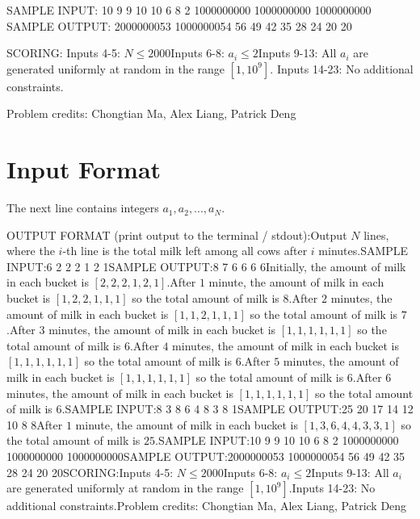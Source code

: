 \documentclass[12pt]{article}
\begin{document}
SAMPLE INPUT:
10
9 9 10 10 6 8 2 1000000000 1000000000 1000000000
SAMPLE OUTPUT: 
2000000053
1000000054
56
49
42
35
28
24
20
20

SCORING:
Inputs 4-5: $N \le 2000$Inputs 6-8: $a_i \le 2$Inputs
9-13: All $a_i$ are generated uniformly at random in the range $[1,10^9]$. Inputs 14-23: No additional constraints.


Problem credits: Chongtian Ma, Alex Liang, Patrick Deng



\section*{Input Format}
The next line contains integers $a_1,a_2,...,a_N$.

OUTPUT FORMAT (print output to the terminal / stdout):Output $N$ lines, where the $i$-th line is the total milk left among all cows
after $i$ minutes.SAMPLE INPUT:6
2 2 2 1 2 1SAMPLE OUTPUT:8
7
6
6
6
6Initially, the amount of milk in each bucket is $[2, 2, 2, 1, 2, 1]$.After $1$ minute, the amount of milk in each bucket is $[1, 2, 2, 1, 1, 1]$
so the total amount of milk is $8$.After $2$ minutes, the amount of
milk in each bucket is $[1, 1, 2, 1, 1, 1]$ so the total amount of milk is
$7$.After $3$ minutes, the amount of milk in each bucket is
$[1, 1, 1, 1, 1, 1]$ so the total amount of milk is $6$.After $4$
minutes, the amount of milk in each bucket is  $[1, 1, 1, 1, 1, 1]$ so the total
amount of milk is $6$.After $5$ minutes, the amount of milk in each
bucket is $[1, 1, 1, 1, 1, 1]$ so the total amount of milk is $6$.After $6$ minutes, the amount of milk in each bucket is $[1, 1, 1, 1, 1, 1]$
so the total amount of milk is
$6$.SAMPLE INPUT:8
3 8 6 4 8 3 8 1SAMPLE OUTPUT:25
20
17
14
12
10
8
8After $1$ minute, the amount of milk in each bucket is
$[1, 3, 6, 4, 4, 3, 3, 1]$ so the total amount of milk is $25$.SAMPLE INPUT:10
9 9 10 10 6 8 2 1000000000 1000000000 1000000000SAMPLE OUTPUT:2000000053
1000000054
56
49
42
35
28
24
20
20SCORING:Inputs 4-5: $N \le 2000$Inputs 6-8: $a_i \le 2$Inputs
9-13: All $a_i$ are generated uniformly at random in the range $[1,10^9]$.Inputs 14-23: No additional constraints.Problem credits: Chongtian Ma, Alex Liang, Patrick Deng
\end{document}
